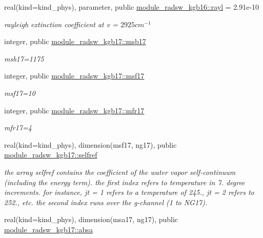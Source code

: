 \begin{Indent}
\begin{DoxyCompactItemize}
\item 
real(kind=kind\+\_\+phys), parameter, public \hyperlink{group__module__radsw__kgbnn_ga27964e0300eb686acf1ed3c8459d3810}{module\+\_\+radsw\+\_\+kgb16\+::rayl} = 2.\+91e-\/10
\begin{DoxyCompactList}\small\item\em rayleigh extinction coefficient at v = $2925 cm^{-1}$ \end{DoxyCompactList}\item 
integer, public \hyperlink{group__module__radsw__kgbnn_gafbb056103147b8e5f4d5a8af40420ea0}{module\+\_\+radsw\+\_\+kgb17\+::msb17}
\begin{DoxyCompactList}\small\item\em msb17=1175 \end{DoxyCompactList}\item 
integer, public \hyperlink{group__module__radsw__kgbnn_ga6864c3b95515fb2f408e21298da3952f}{module\+\_\+radsw\+\_\+kgb17\+::msf17}
\begin{DoxyCompactList}\small\item\em msf17=10 \end{DoxyCompactList}\item 
integer, public \hyperlink{group__module__radsw__kgbnn_gadd099d7e1b5e7767d77de6d96673e26f}{module\+\_\+radsw\+\_\+kgb17\+::mfr17}
\begin{DoxyCompactList}\small\item\em mfr17=4 \end{DoxyCompactList}\item 
real(kind=kind\+\_\+phys), dimension(msf17, ng17), public \hyperlink{group__module__radsw__kgbnn_gaade34dfbe8c5f380088b6e03acc727c9}{module\+\_\+radsw\+\_\+kgb17\+::selfref}
\begin{DoxyCompactList}\small\item\em the array selfref contains the coefficient of the water vapor self-\/continuum (including the energy term). the first index refers to temperature in 7. degree increments. for instance, jt = 1 refers to a temperature of 245., jt = 2 refers to 252., etc. the second index runs over the g-\/channel (1 to N\+G17). \end{DoxyCompactList}\item 
real(kind=kind\+\_\+phys), dimension(msa17, ng17), public \hyperlink{group__module__radsw__kgbnn_ga19083764c3dfe437282b032517baf3ed}{module\+\_\+radsw\+\_\+kgb17\+::absa}

\end{DoxyCompactItemize}
\end{Indent}
